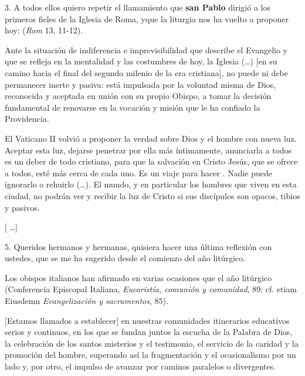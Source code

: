 \begin{body}
	3. A todos ellos quiero repetir el llamamiento que \textbf{san Pablo} dirigió a los primeros fieles de la Iglesia de Roma, y ​​que la liturgia nos ha vuelto a proponer hoy:  (\emph{Rom} 13, 11-12).
	
	Ante la situación de indiferencia e imprevisibilidad que describe el Evangelio y que se refleja en la mentalidad y las costumbres de hoy, la Iglesia (\ldots{}) {[}en su camino hacia el final del segundo milenio de la era cristiana{]}, no puede ni debe permanecer inerte y pasiva: está impulsada por la voluntad misma de Dios, reconocida y aceptada en unión con su propio Obispo, a tomar la decisión fundamental de renovarse en la vocación y misión que le ha confiado la Providencia.
	
	El Vaticano II volvió a proponer la verdad sobre Dios y el hombre con nueva luz. Aceptar esta luz, dejarse penetrar por ella más íntimamente, anunciarla a todos es un deber de todo cristiano, para que la salvación en Cristo Jesús, que se ofrece a todos, esté más cerca de cada uno. Es un viaje para hacer . Nadie puede ignorarlo o rehuirlo (\ldots{}). El mundo, y en particular los hombres que viven en esta ciudad, no podrán ver y recibir la luz de Cristo si sus discípulos son opacos, tibios y pasivos.
	
	{[} \ldots{}{]}
	
	5. Queridos hermanos y hermanas, quisiera hacer una última reflexión con ustedes, que se me ha sugerido desde el comienzo del año litúrgico.
	
	Los obispos italianos han afirmado en varias ocasiones que el año litúrgico  (Conferencia Episcopal Italiana, \emph{Eucaristía, comunión y comunidad}, 89; cf. etiam Eiusdemn \emph{Evangelización y sacramentos}, 85).
	
	{[}Estamos llamados a establecer{]} en nuestras comunidades itinerarios educativos serios y continuos, en los que se fundan juntos la escucha de la Palabra de Dios, la celebración de los santos misterios y el testimonio, el servicio de la caridad y la promoción del hombre, superando así la fragmentación y el ocasionalismo por un lado y, por otro, el impulso de avanzar por caminos paralelos o divergentes.
	

\end{body}
